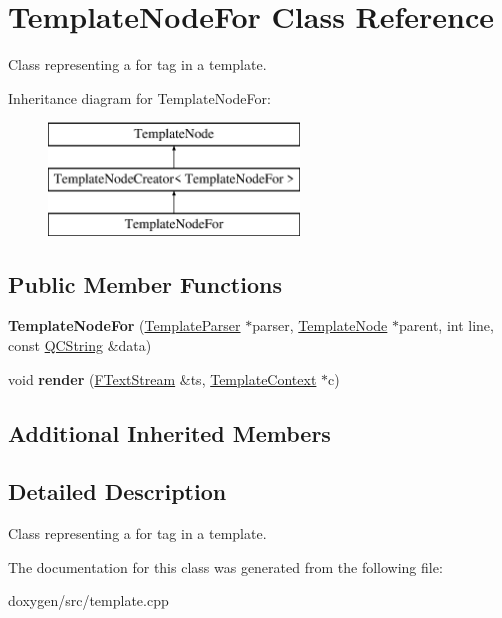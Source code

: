 \hypertarget{class_template_node_for}{}\section{Template\+Node\+For Class Reference}
\label{class_template_node_for}


Class representing a \textquotesingle{}for\textquotesingle{} tag in a template.  


Inheritance diagram for Template\+Node\+For\+:\begin{figure}[H]
\begin{center}
\leavevmode
\includegraphics[height=3.000000cm]{class_template_node_for}
\end{center}
\end{figure}
\subsection*{Public Member Functions}
\begin{DoxyCompactItemize}
\item 
\mbox{\label{class_template_node_for_abd2749f0fe1733845ff5099521066cc6}} 
{\bfseries Template\+Node\+For} (\mbox{\hyperlink{class_template_parser}{Template\+Parser}} $\ast$parser, \mbox{\hyperlink{class_template_node}{Template\+Node}} $\ast$parent, int line, const \mbox{\hyperlink{class_q_c_string}{Q\+C\+String}} \&data)
\item 
\mbox{\label{class_template_node_for_ad6509478f0188b814451adf3a75c696a}} 
void {\bfseries render} (\mbox{\hyperlink{class_f_text_stream}{F\+Text\+Stream}} \&ts, \mbox{\hyperlink{class_template_context}{Template\+Context}} $\ast$c)
\end{DoxyCompactItemize}
\subsection*{Additional Inherited Members}


\subsection{Detailed Description}
Class representing a \textquotesingle{}for\textquotesingle{} tag in a template. 

The documentation for this class was generated from the following file\+:\begin{DoxyCompactItemize}
\item 
doxygen/src/template.\+cpp\end{DoxyCompactItemize}
